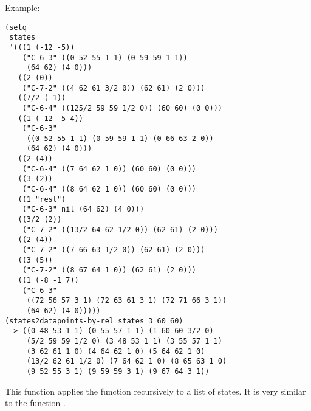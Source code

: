 \vspace{0.5cm}
\noindent Example:
\begin{verbatim}
(setq 
 states
 '(((1 (-12 -5))
    ("C-6-3" ((0 52 55 1 1) (0 59 59 1 1))
     (64 62) (4 0)))
   ((2 (0))
    ("C-7-2" ((4 62 61 3/2 0)) (62 61) (2 0)))
   ((7/2 (-1))
    ("C-6-4" ((125/2 59 59 1/2 0)) (60 60) (0 0)))
   ((1 (-12 -5 4))
    ("C-6-3"
     ((0 52 55 1 1) (0 59 59 1 1) (0 66 63 2 0))
     (64 62) (4 0)))
   ((2 (4))
    ("C-6-4" ((7 64 62 1 0)) (60 60) (0 0)))
   ((3 (2))
    ("C-6-4" ((8 64 62 1 0)) (60 60) (0 0)))
   ((1 "rest")
    ("C-6-3" nil (64 62) (4 0)))
   ((3/2 (2))
    ("C-7-2" ((13/2 64 62 1/2 0)) (62 61) (2 0)))
   ((2 (4))
    ("C-7-2" ((7 66 63 1/2 0)) (62 61) (2 0)))
   ((3 (5))
    ("C-7-2" ((8 67 64 1 0)) (62 61) (2 0)))
   ((1 (-8 -1 7))
    ("C-6-3"
     ((72 56 57 3 1) (72 63 61 3 1) (72 71 66 3 1))
     (64 62) (4 0)))))
(states2datapoints-by-rel states 3 60 60)
--> ((0 48 53 1 1) (0 55 57 1 1) (1 60 60 3/2 0)
     (5/2 59 59 1/2 0) (3 48 53 1 1) (3 55 57 1 1)
     (3 62 61 1 0) (4 64 62 1 0) (5 64 62 1 0)
     (13/2 62 61 1/2 0) (7 64 62 1 0) (8 65 63 1 0)
     (9 52 55 3 1) (9 59 59 3 1) (9 67 64 3 1))
\end{verbatim}

This function applies the function
recursively to a list of states. It is very similar
to the function
.


